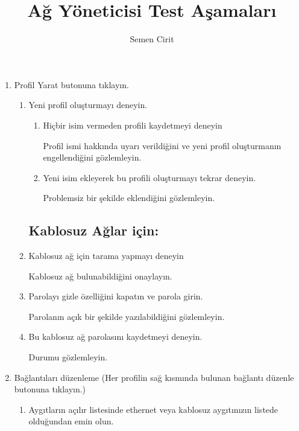 \documentclass[a4paper,10pt]{article}
\title{Ağ Yöneticisi Test Aşamaları}
\author{Semen Cirit}
\begin{document}
\maketitle

\begin{enumerate}
  \item Profil Yarat butonuna tıklayın.
    \begin{enumerate}
     \subsection*{Ethernet veya Kablosuz ağlar için:}
	
      \item Yeni profil oluşturmayı deneyin.
	\begin{enumerate}
	  \item  Hiçbir isim vermeden profili kaydetmeyi deneyin

		Profil ismi hakkında uyarı verildiğini ve yeni profil oluşturmanın engellendiğini gözlemleyin.
	  \item Yeni isim ekleyerek bu profili oluşturmayı tekrar deneyin.

		Problemsiz bir şekilde eklendiğini gözlemleyin.
	\end{enumerate}
      
     \subsection*{Kablosuz Ağlar için:}
     \item Kablosuz ağ için tarama yapmayı deneyin
      
	Kablosuz ağ bulunabildiğini onaylayın.
     \item Parolayı gizle özelliğini kapatın ve parola girin.
        
	Parolanın açık bir şekilde yazılabildiğini gözlemleyin.
      \item Bu kablosuz ağ parolasını kaydetmeyi deneyin.
	
      	Durumu gözlemleyin.
     
     \end{enumerate}
     \item Bağlantıları düzenleme (Her profilin sağ kısmında bulunan bağlantı düzenle butonuna tıklayın.)
    
      \begin{enumerate}
      \item Aygıtların açılır listesinde ethernet veya kablosuz aygıtınızın listede olduğundan emin olun.


\end{enumerate}
\end{enumerate}
\end{document}
